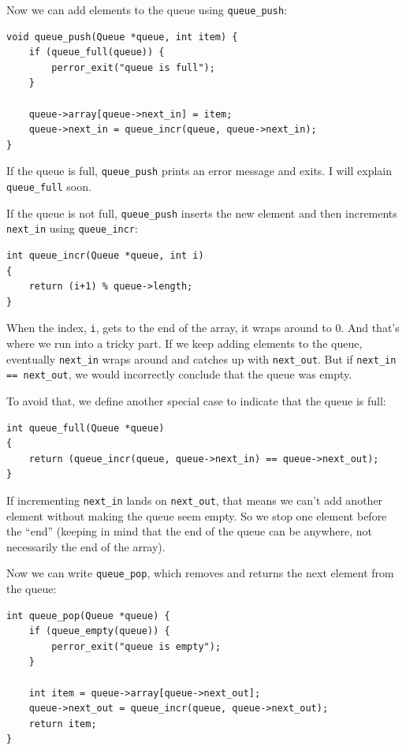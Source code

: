 \documentclass[12pt]{book}
\begin{document}
{Now we can add elements to the queue using \verb"queue_push":

\begin{verbatim}
void queue_push(Queue *queue, int item) {
    if (queue_full(queue)) {
        perror_exit("queue is full");
    }
  
    queue->array[queue->next_in] = item;
    queue->next_in = queue_incr(queue, queue->next_in);
}
\end{verbatim}

If the queue is full, \verb"queue_push" prints an error message
and exits.  I will explain \verb"queue_full" soon.

If the queue is not full, \verb"queue_push" inserts the new
element and then increments \verb"next_in" using \verb"queue_incr":

\begin{verbatim}
int queue_incr(Queue *queue, int i)
{
    return (i+1) % queue->length;
}
\end{verbatim}

When the index, {\tt i}, gets to the end of the array, it wraps around
to 0.  And that's where we run into a tricky part.  If we keep adding
elements to the queue, eventually \verb"next_in" wraps around and catches
up with \verb"next_out".  But if \verb"next_in == next_out", we would
incorrectly conclude that the queue was empty.

To avoid that, we define another special case to indicate that the
queue is full:

\begin{verbatim}
int queue_full(Queue *queue)
{
    return (queue_incr(queue, queue->next_in) == queue->next_out);
}
\end{verbatim}

If incrementing \verb"next_in" lands on \verb"next_out", that means
we can't add another element without making the queue seem empty.  So
we stop one element before the ``end'' (keeping in mind that the end of
the queue can be anywhere, not necessarily the end of the array).

Now we can write \verb"queue_pop", which removes and returns the next
element from the queue:

\begin{verbatim}
int queue_pop(Queue *queue) {
    if (queue_empty(queue)) {
        perror_exit("queue is empty");
    }
  
    int item = queue->array[queue->next_out];
    queue->next_out = queue_incr(queue, queue->next_out);
    return item;
}
\end{verbatim}

}
\end{document}
